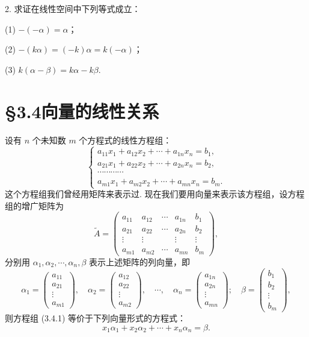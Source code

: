 \documentclass[UTF8, 12pt, fontset=fandol, oneside]{ctexart}
\begin{document}
2. 求证在线性空间中下列等式成立：

(1) $-(-\alpha)=\alpha$；

(2) $-(k\alpha)=(-k)\alpha=k(-\alpha)$；

(3) $k(\alpha-\beta)=k\alpha-k\beta$.

\section*{§3.4\quad 向量的线性关系}

设有 $n$ 个未知数 $m$ 个方程式的线性方程组：
\begin{equation}
\left\{
\begin{array}{l}
a_{11}x_1+a_{12}x_2+\cdots+a_{1n}x_n=b_1,\\
a_{21}x_1+a_{22}x_2+\cdots+a_{2n}x_n=b_2,\\
\cdots\cdots\cdots\cdots\\
a_{m1}x_1+a_{m2}x_2+\cdots+a_{mn}x_n=b_m.
\end{array}
\right.
\tag{3.4.1}
\end{equation}
这个方程组我们曾经用矩阵来表示过. 现在我们要用向量来表示该方程组，设方程组的增广矩阵为
\[
\widetilde{A}=
\left(\begin{array}{ccccc}
a_{11}&a_{12}&\cdots&a_{1n}&b_1\\
a_{21}&a_{22}&\cdots&a_{2n}&b_2\\
\vdots&\vdots&&\vdots&\vdots\\
a_{m1}&a_{m2}&\cdots&a_{mn}&b_m
\end{array}\right),
\]
分别用 $\alpha_1,\alpha_2,\cdots,\alpha_n,\beta$ 表示上述矩阵的列向量，即
\[
\alpha_1=\left(\begin{array}{c}
a_{11}\\
a_{21}\\
\vdots\\
a_{m1}
\end{array}\right),\quad
\alpha_2=\left(\begin{array}{c}
a_{12}\\
a_{22}\\
\vdots\\
a_{m2}
\end{array}\right),\quad \cdots,\quad
\alpha_n=\left(\begin{array}{c}
a_{1n}\\
a_{2n}\\
\vdots\\
a_{mn}
\end{array}\right);\quad
\beta=\left(\begin{array}{c}
b_1\\
b_2\\
\vdots\\
b_m
\end{array}\right),
\]
则方程组 (3.4.1) 等价于下列向量形式的方程式：
\begin{equation}
x_1\alpha_1+x_2\alpha_2+\cdots+x_n\alpha_n=\beta.
\tag{3.4.2}
\end{equation}
\end{document}
